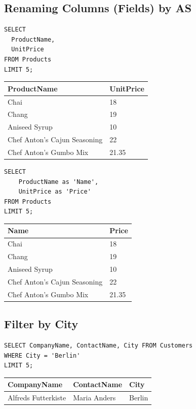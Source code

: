 \documentclass[10pt]{article}
\begin{document}
\subsection{Renaming Columns (Fields) by AS}

\begin{verbatim}
SELECT 
  ProductName, 
  UnitPrice
FROM Products 
LIMIT 5;
\end{verbatim}

\begin{table}[H]
\begin{tabular}{|l|l|}
\hline
ProductName	& UnitPrice \\
\hline
Chai	& 18 \\
Chang	& 19 \\
Aniseed Syrup	& 10 \\
Chef Anton's Cajun Seasoning	& 22 \\
Chef Anton's Gumbo Mix	& 21.35 \\
\hline
\end{tabular}
\end{table}


\begin{verbatim}
SELECT 
    ProductName as 'Name', 
    UnitPrice as 'Price'
FROM Products 
LIMIT 5;
\end{verbatim}

\begin{table}[H]
\begin{tabular}{|l|l|}
\hline
Name 	& Price \\
\hline
Chai	& 18 \\
Chang	& 19 \\
Aniseed Syrup	& 10 \\
Chef Anton's Cajun Seasoning	& 22 \\     
Chef Anton's Gumbo Mix	& 21.35 \\
\hline
\end{tabular}
\end{table}



\subsection{Filter by City}
\begin{verbatim}
SELECT CompanyName, ContactName, City FROM Customers 
WHERE City = 'Berlin'
LIMIT 5;
\end{verbatim}


\begin{table}[H]
\begin{tabular}{|l|l|l|}
\hline
CompanyName	& ContactName	& City \\
\hline
Alfreds Futterkiste	& Maria Anders	& Berlin \\
\hline
\end{tabular}
\end{table}
\end{document}
